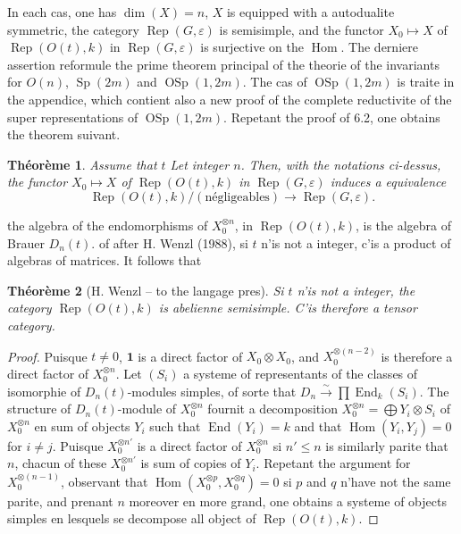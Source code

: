 \documentclass[11pt,a4paper]{article}
\theoremstyle{plain}
\newtheorem{theorem}{Th\'eor\`eme}[section]
\theoremstyle{definition}
\DeclareMathOperator{\Hom}{Hom}
\DeclareMathOperator{\End}{End}
\DeclareMathOperator{\Rep}{Rep}
\DeclareMathOperator{\Sp}{Sp}
\DeclareMathOperator{\OSp}{OSp}
\newcommand{\eps}{\varepsilon}
\newcommand{\isom}{\xrightarrow{\sim}}
\begin{document}
In each cas, one has $\dim(X) = n$, $X$ is equipped with a autodualite symmetric, the category $\Rep(G, \eps)$ is semisimple, and the functor $X_0 \mapsto X$ of $\Rep(O(t), k)$ in $\Rep(G, \eps)$ is surjective on the $\Hom$. The derniere assertion reformule the prime theorem principal of the theorie of the invariants for $O(n)$, $\Sp(2m)$ and $\OSp(1, 2m)$. The cas of $\OSp(1, 2m)$ is traite in the appendice, which contient also a new proof of the complete reductivite of the super representations of $\OSp(1, 2m)$. Repetant the proof of 6.2, one obtains the theorem suivant.

\begin{theorem}
Assume that $t$ Let integer $n$. Then, with the notations ci-dessus, the functor $X_0 \mapsto X$ of $\Rep(O(t), k)$ in $\Rep(G, \eps)$ induces a equivalence
\[
\Rep(O(t), k)/(\text{n\'egligeables}) \to \Rep(G, \eps).
\]
\end{theorem}

the algebra of the endomorphisms of $X_0^{\otimes n}$, in $\Rep(O(t), k)$, is the algebra of Brauer $D_n(t)$. of after H. Wenzl (1988), si $t$ n'is not a integer, c'is a product of algebras of matrices. It follows that

\begin{theorem}[H. Wenzl -- to the langage pres]
Si $t$ n'is not a integer, the category $\Rep(O(t), k)$ is abelienne semisimple. C'is therefore a tensor category.
\end{theorem}

\begin{proof}
Puisque $t \neq 0$, $\mathbf{1}$ is a direct factor of $X_0 \otimes X_0$, and $X_0^{\otimes (n-2)}$ is therefore a direct factor of $X_0^{\otimes n}$. Let $(S_i)$ a systeme of representants of the classes of isomorphie of $D_n(t)$-modules simples, of sorte that $D_n \isom \prod \End_k(S_i)$. The structure of $D_n(t)$-module of $X_0^{\otimes n}$ fournit a decomposition $X_0^{\otimes n} = \bigoplus Y_i \otimes S_i$ of $X_0^{\otimes n}$ en sum of objects $Y_i$ such that $\End(Y_i) = k$ and that $\Hom(Y_i, Y_j) = 0$ for $i \neq j$. Puisque $X_0^{\otimes n'}$ is a direct factor of $X_0^{\otimes n}$ si $n' \leq n$ is similarly parite that $n$, chacun of these $X_0^{\otimes n'}$ is sum of copies of $Y_i$. Repetant the argument for $X_0^{\otimes (n-1)}$, observant that $\Hom(X_0^{\otimes p}, X_0^{\otimes q}) = 0$ si $p$ and $q$ n'have not the same parite, and prenant $n$ moreover en more grand, one obtains a systeme of objects simples en lesquels se decompose all object of $\Rep(O(t), k)$.
\end{proof}
\end{document}
